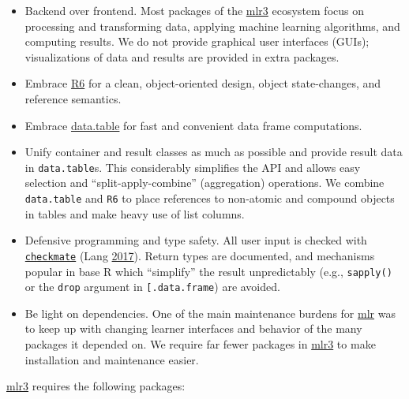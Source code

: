 \documentclass[]{scrbook}
\providecommand{\tightlist}{%
  \setlength{\itemsep}{0pt}\setlength{\parskip}{0pt}}
\begin{document}
\begin{itemize}
\tightlist
\item
  Backend over frontend.
  Most packages of the \href{https://mlr3.mlr-org.com}{mlr3} ecosystem focus on processing and transforming data, applying machine learning algorithms, and computing results.
  We do not provide graphical user interfaces (GUIs); visualizations of data and results are provided in extra packages.
\item
  Embrace \href{https://cran.r-project.org/package=R6}{R6} for a clean, object-oriented design, object state-changes, and reference semantics.
\item
  Embrace \href{https://cran.r-project.org/package=data.table}{data.table} for fast and convenient data frame computations.
\item
  Unify container and result classes as much as possible and provide result data in \texttt{data.table}s.
  This considerably simplifies the API and allows easy selection and ``split-apply-combine'' (aggregation) operations.
  We combine \texttt{data.table} and \texttt{R6} to place references to non-atomic and compound objects in tables and make heavy use of list columns.
\item
  Defensive programming and type safety.
  All user input is checked with \href{https://cran.r-project.org/package=checkmate}{\texttt{checkmate}} (Lang \protect\hyperlink{ref-checkmate}{2017}).
  Return types are documented, and mechanisms popular in base R which ``simplify'' the result unpredictably (e.g., \texttt{sapply()} or the \texttt{drop} argument in \texttt{{[}.data.frame}) are avoided.
\item
  Be light on dependencies.
  One of the main maintenance burdens for \href{https://mlr.mlr-org.com}{mlr} was to keep up with changing learner interfaces and behavior of the many packages it depended on.
  We require far fewer packages in \href{https://mlr3.mlr-org.com}{mlr3} to make installation and maintenance easier.
\end{itemize}

\href{https://mlr3.mlr-org.com}{mlr3} requires the following packages:
\end{document}
